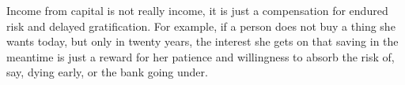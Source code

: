 Income from capital is not really income, it is just a compensation for endured risk and delayed gratification.
For example, if a person does not buy a thing she wants today, but only in twenty years, the interest she gets on that saving in the meantime is just a reward for her patience and willingness to absorb the risk of, say, dying early, or the bank going under.